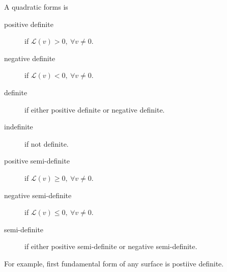 A quadratic forms is
\begin{description}
	\item[positive definite] if $\mathscr{L}(v) > 0,\ \forall v \ne 0$.
	\item[negative definite] if $\mathscr{L}(v) < 0,\ \forall v \ne 0$.
	\item[definite] if either positive definite or negative definite.
	\item[indefinite] if not definite.
	\item[positive semi-definite] if $\mathscr{L}(v) \ge 0,\ \forall v \ne 0$.
	\item[negative semi-definite] if $\mathscr{L}(v) \le 0,\ \forall v \ne 0$.
	\item[semi-definite] if either positive semi-definite or negative semi-definite.
\end{description}

	For example, first fundamental form of any surface is postiive definite.

